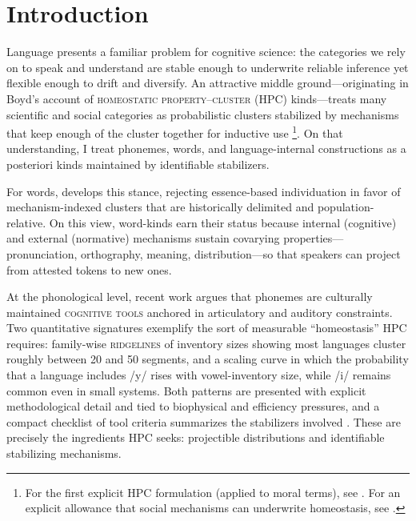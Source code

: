 \documentclass[12pt]{article}
\begin{document}
\section{Introduction}
Language presents a familiar problem for cognitive science: the categories we rely on to speak and understand are stable enough to underwrite reliable inference yet flexible enough to drift and diversify. An attractive middle ground---originating in Boyd’s account of \textsc{homeostatic property–cluster} (HPC) kinds---treats many scientific and social categories as probabilistic clusters stabilized by mechanisms that keep enough of the cluster together for inductive use \citep{Boyd1991Enthusiasm,Boyd1999Homeostasis}\footnote{For the first explicit HPC formulation (applied to moral terms), see \citet[§3.8]{Boyd1988MoralRealist}. For an explicit allowance that social mechanisms can underwrite homeostasis, see \citet{Boyd2000Workmanship}.}. On that understanding, I treat phonemes, words, and language-internal constructions as a posteriori kinds maintained by identifiable stabilizers.

For words, \citet{Miller2021WordsSpeciesKinds} develops this stance, rejecting essence-based individuation in favor of mechanism-indexed clusters that are historically delimited and population-relative. On this view, word-kinds earn their status because internal (cognitive) and external (normative) mechanisms sustain covarying properties---pronunciation, orthography, meaning, distribution---so that speakers can project from attested tokens to new ones.


At the phonological level, recent work argues that phonemes are culturally maintained \textsc{cognitive tools} anchored in articulatory and auditory constraints. Two quantitative signatures exemplify the sort of measurable ``homeostasis'' HPC requires: family-wise \textsc{ridgelines} of inventory sizes showing most languages cluster roughly between 20 and 50 segments, and a scaling curve in which the probability that a language includes /y/ rises with vowel-inventory size, while /i/ remains common even in small systems. Both patterns are presented with explicit methodological detail and tied to biophysical and efficiency pressures, and a compact checklist of tool criteria summarizes the stabilizers involved \citep[Fig.\,1 p.\,4; Fig.\,2 p.\,7; Table\,1 p.\,14]{Ekstrom2025PhonemeTool}. These are precisely the ingredients HPC seeks: projectible distributions and identifiable stabilizing mechanisms.
\end{document}
